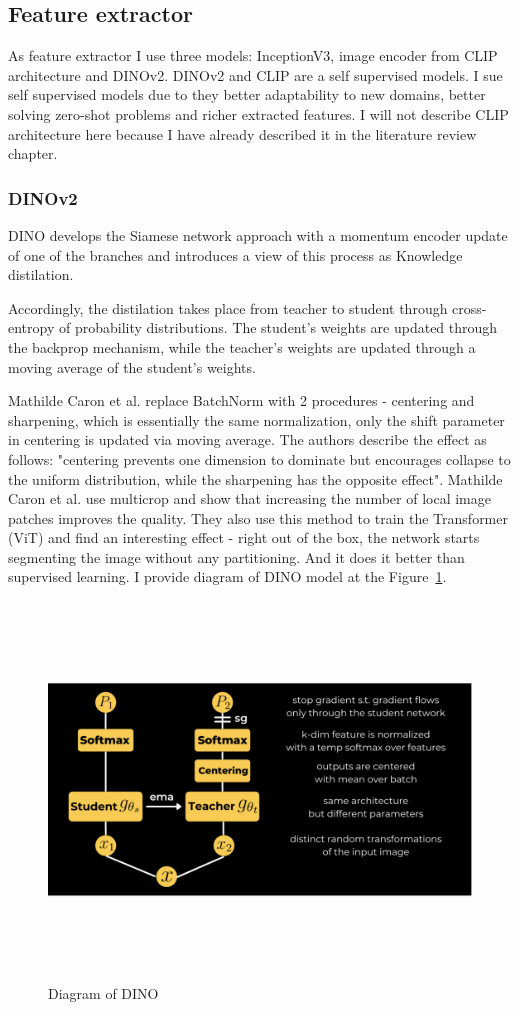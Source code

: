 \subsection{Feature extractor}
As feature extractor I use three models: InceptionV3, image encoder from CLIP architecture and DINOv2. DINOv2 and CLIP are a self supervised models. I sue self supervised models due to they better adaptability to new domains, better solving zero-shot problems and richer extracted features. I will not describe CLIP architecture here because I have already described it in the literature review chapter.
\subsubsection{DINOv2}
DINO\cite{DINO} develops the Siamese network approach with a momentum encoder update of one of the branches and introduces a view of this process as Knowledge distilation. 

Accordingly, the distilation takes place from teacher to student through cross-entropy of probability distributions. The student's weights are updated through the backprop mechanism, while the teacher's weights are updated through a moving average of the student's weights.

Mathilde Caron et al. \cite{DINO} replace BatchNorm with 2 procedures - centering and sharpening, which is essentially the same normalization, only the shift parameter in centering is updated via moving average. The authors describe the effect as follows: "centering prevents one dimension to dominate but encourages collapse to the uniform distribution, while the sharpening has the opposite effect"\cite[p.4]{DINO}. Mathilde Caron et al. \cite{DINO} use multicrop and show that increasing the number of local image patches improves the quality.
They also use this method to train the Transformer (ViT) and find an interesting effect - right out of the box, the network starts segmenting the image without any partitioning. And it does it better than supervised learning. I provide diagram of DINO model at the Figure~\ref{fig:DINO_dian}.
\begin{figure}[hbt]
\centering
\includegraphics[width=15cm, height=10cm]{figs/DINO_diag.png}
\caption{Diagram of DINO}
\label{fig:DINO_dian}
\end{figure}

